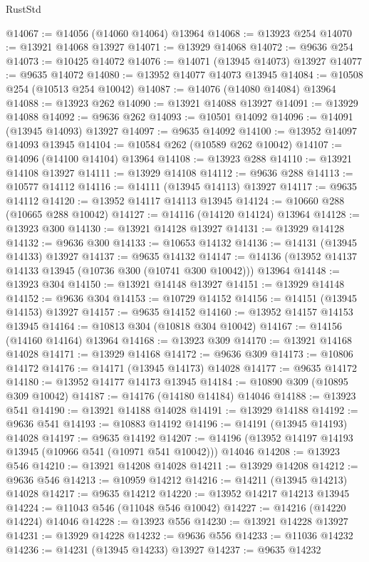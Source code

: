 \begin{lexlean}{RustStd}
\begin{coremodule}
@14067 := @14056 (@14060 @14064) @13964
@14068 := @13923 @254
@14070 := @13921 @14068 @13927
@14071 := @13929 @14068
@14072 := @9636 @254
@14073 := @10425 @14072
@14076 := @14071 (@13945 @14073) @13927
@14077 := @9635 @14072
@14080 := @13952 @14077 @14073 @13945
@14084 := @10508 @254 (@10513 @254 @10042)
@14087 := @14076 (@14080 @14084) @13964
@14088 := @13923 @262
@14090 := @13921 @14088 @13927
@14091 := @13929 @14088
@14092 := @9636 @262
@14093 := @10501 @14092
@14096 := @14091 (@13945 @14093) @13927
@14097 := @9635 @14092
@14100 := @13952 @14097 @14093 @13945
@14104 := @10584 @262 (@10589 @262 @10042)
@14107 := @14096 (@14100 @14104) @13964
@14108 := @13923 @288
@14110 := @13921 @14108 @13927
@14111 := @13929 @14108
@14112 := @9636 @288
@14113 := @10577 @14112
@14116 := @14111 (@13945 @14113) @13927
@14117 := @9635 @14112
@14120 := @13952 @14117 @14113 @13945
@14124 := @10660 @288 (@10665 @288 @10042)
@14127 := @14116 (@14120 @14124) @13964
@14128 := @13923 @300
@14130 := @13921 @14128 @13927
@14131 := @13929 @14128
@14132 := @9636 @300
@14133 := @10653 @14132
@14136 := @14131 (@13945 @14133) @13927
@14137 := @9635 @14132
@14147 := @14136 (@13952 @14137 @14133 @13945 (@10736 @300 (@10741 @300 @10042))) @13964
@14148 := @13923 @304
@14150 := @13921 @14148 @13927
@14151 := @13929 @14148
@14152 := @9636 @304
@14153 := @10729 @14152
@14156 := @14151 (@13945 @14153) @13927
@14157 := @9635 @14152
@14160 := @13952 @14157 @14153 @13945
@14164 := @10813 @304 (@10818 @304 @10042)
@14167 := @14156 (@14160 @14164) @13964
@14168 := @13923 @309
@14170 := @13921 @14168 @14028
@14171 := @13929 @14168
@14172 := @9636 @309
@14173 := @10806 @14172
@14176 := @14171 (@13945 @14173) @14028
@14177 := @9635 @14172
@14180 := @13952 @14177 @14173 @13945
@14184 := @10890 @309 (@10895 @309 @10042)
@14187 := @14176 (@14180 @14184) @14046
@14188 := @13923 @541
@14190 := @13921 @14188 @14028
@14191 := @13929 @14188
@14192 := @9636 @541
@14193 := @10883 @14192
@14196 := @14191 (@13945 @14193) @14028
@14197 := @9635 @14192
@14207 := @14196 (@13952 @14197 @14193 @13945 (@10966 @541 (@10971 @541 @10042))) @14046
@14208 := @13923 @546
@14210 := @13921 @14208 @14028
@14211 := @13929 @14208
@14212 := @9636 @546
@14213 := @10959 @14212
@14216 := @14211 (@13945 @14213) @14028
@14217 := @9635 @14212
@14220 := @13952 @14217 @14213 @13945
@14224 := @11043 @546 (@11048 @546 @10042)
@14227 := @14216 (@14220 @14224) @14046
@14228 := @13923 @556
@14230 := @13921 @14228 @13927
@14231 := @13929 @14228
@14232 := @9636 @556
@14233 := @11036 @14232
@14236 := @14231 (@13945 @14233) @13927
@14237 := @9635 @14232

\end{coremodule}
\end{lexlean}
